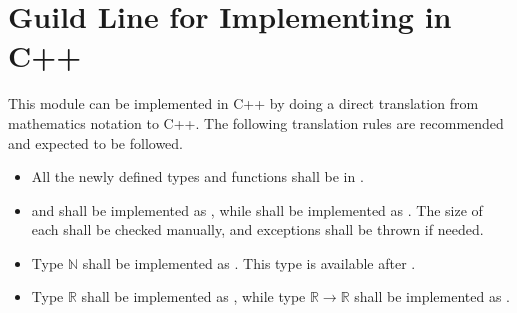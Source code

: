 \documentclass[12pt, titlepage]{article}
\begin{document}
\section{Guild Line for Implementing in C++}\label{Appendix:guildeline}
This module can be implemented in C++ by doing a direct translation from mathematics notation to C++.
The following translation rules are recommended and expected to be followed.
\begin{itemize}
	\item All the newly defined types and functions shall be in .
	\item {} and  shall be implemented as , while  shall be implemented as . The size of each  shall be checked manually, and exceptions shall be thrown if needed.
	\item Type $\mathbb{N}$ shall be implemented as . This type is available after . 
	\item Type $\mathbb{R}$ shall be implemented as , while type $\mathbb{R}\rightarrow\mathbb{R}$ shall be implemented as . 
\end{itemize}
\end{document}
